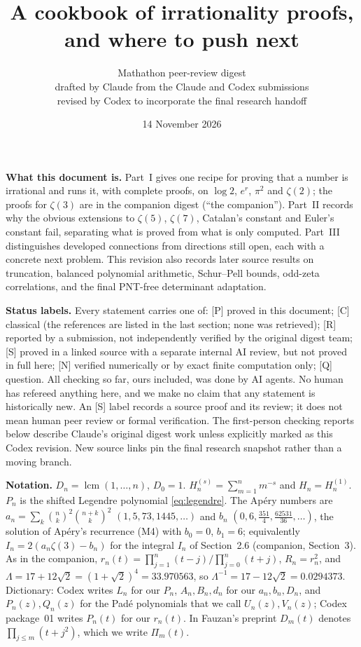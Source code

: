 \documentclass[11pt,a4paper]{article}
\title{A cookbook of irrationality proofs,\\ and where to push next}
\author{Mathathon peer-review digest\\
{\normalsize drafted by Claude from the Claude and Codex submissions}\\
{\small revised by Codex to incorporate the final research handoff}}
\date{14 November 2026}
\newcommand{\st}[1]{\textsf{[#1]}}
\DeclareMathOperator{\lcm}{lcm}
\theoremstyle{definition}
\begin{document}
{\let\newpage\relax\vspace*{-14mm}\maketitle}\vspace{-3mm}

\noindent\textbf{What this document is.}
Part~I gives one recipe for proving that a number is irrational and runs it, with complete proofs,
on $\log 2$, $e^r$, $\pi^2$ and $\zeta(2)$; the proofs for $\zeta(3)$ are in the companion digest
 (``the companion''). Part~II records why the obvious extensions to
$\zeta(5)$, $\zeta(7)$, Catalan's constant and Euler's constant fail, separating what is proved from
what is only computed. Part~III distinguishes developed connections from directions still open, each with a concrete next problem.
This revision also records later source results on truncation, balanced polynomial arithmetic,
Schur--Pell bounds, odd-zeta correlations, and the final PNT-free determinant adaptation.

\smallskip\noindent\textbf{Status labels.} Every statement carries one of:
\st{P} proved in this document;
\st{C} classical (the references are listed in the last section; none was retrieved);
\st{R} reported by a submission, not independently verified by the original digest team;
\st{S} proved in a linked source with a separate internal AI review, but not proved in full here;
\st{N} verified numerically or by exact finite computation only;
\st{Q} question.
All checking so far, ours included, was done by AI agents. No human has refereed anything here, and
we make no claim that any statement is historically new.
An \st{S} label records a source proof and its review; it does not mean human peer review or formal verification.
The first-person checking reports below describe Claude's original digest work unless explicitly marked
as this Codex revision. New source links pin the final research snapshot rather than a moving branch.

\smallskip\noindent\textbf{Notation.} $D_n=\lcm(1,\dots,n)$, $D_0=1$.
$H_n^{(s)}=\sum_{m=1}^n m^{-s}$ and $H_n=H_n^{(1)}$.
$P_n$ is the shifted Legendre polynomial \eqref{eq:legendre}.
The Ap\'ery numbers are $a_n=\sum_{k}\binom nk^2\binom{n+k}k^2$ $(1,5,73,1445,\dots)$ and $b_n$
$(0,6,\frac{351}4,\frac{62531}{36},\dots)$, the solution of Ap\'ery's recurrence (M4) with $b_0=0$, $b_1=6$;
equivalently $I_n=2(a_n\zeta(3)-b_n)$ for the integral $I_n$ of Section~2.6 (companion, Section~3). As in the companion,
$r_n(t)=\prod_{j=1}^n(t-j)\big/\prod_{j=0}^n(t+j)$, $R_n=r_n^2$, and
$\Lambda=17+12\sqrt2=(1+\sqrt2)^4=33.970563$, so $\Lambda^{-1}=17-12\sqrt2=0.0294373$.
Dictionary: Codex writes $L_n$ for our $P_n$, $A_n,B_n,d_n$ for our $a_n,b_n,D_n$, and
$P_n(z),Q_n(z)$ for the Pad\'e polynomials that we call $U_n(z),V_n(z)$; Codex package~01 writes $P_n(t)$ for our $r_n(t)$. In Fauzan's preprint $D_m(t)$
denotes $\prod_{j\le m}(t+j^2)$, which we write $\Pi_m(t)$.
\end{document}

